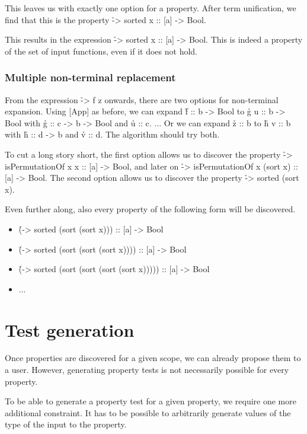 \documentclass[a4paper, 11pt]{article}
\begin{document}
This leaves us with exactly one option for a property.
After term unification, we find that this is the property \h{\x -> sorted x :: [a] -> Bool}.

This results in the expression \h{\a -> sorted x :: [a] -> Bool}.
This is indeed a property of the set of input functions, even if it does not hold.

\subsubsection{Multiple non-terminal replacement}

From the expression \h{\x -> f z} onwards, there are two options for non-terminal expansion.
Using [App] as before, we can expand \h{f :: b -> Bool} to \h{g u :: b -> Bool} with \h{g :: c -> b -> Bool} and \h{u :: c}.
... Or we can expand \h{z :: b} to \h{h v :: b} with \h{h :: d -> b} and \h{v :: d}.
The algorithm should try both.

To cut a long story short, the first option allows us to discover the property \h{\x -> isPermutationOf x x :: [a] -> Bool}, and later on \h{\x -> isPermutationOf x (sort x) :: [a] -> Bool}.
The second option allows us to discover the property \h{\x -> sorted (sort x)}.

Even further along, also every property of the following form will be discovered.

\begin{itemize}
  \item \h{(\x -> sorted (sort (sort x))) :: [a] -> Bool}
  \item \h{(\x -> sorted (sort (sort (sort x)))) :: [a] -> Bool}
  \item \h{(\x -> sorted (sort (sort (sort (sort x))))) :: [a] -> Bool}
  \item ...
\end{itemize}

\section{Test generation}

Once properties are discovered for a given scope, we can already propose them to a user.
However, generating property tests is not necessarily possible for every property.

To be able to generate a property test for a given property, we require one more additional constraint.
It has to be possible to arbitrarily generate values of the type of the input to the property.
\end{document}
